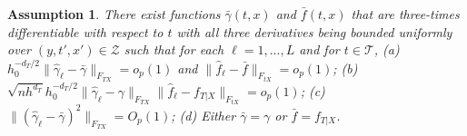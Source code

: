 \documentclass[lettersize, 12pt]{article}
\newtheorem{assumption}{Assumption}
\begin{document}
\begin{assumption}
There exist functions $\bar \gamma(t,x)$ and $\bar f(t,x)$ that 
are three-times differentiable with respect to $t$ with all
three derivatives being bounded uniformly over $(y,t',x') \in\mathcal{Z}$ such that 
for each $\ell = 1,..., L$ and for $t\in\mathcal{T}$,
(a) $h_0^{-d_T/2}\|\hat\gamma_\ell-\bar \gamma\|_{F_{TX}} = o_p(1)$
and $\|\hat f_\ell - \bar f\|_{F_{tX}}= o_p(1)$;
(b) $\sqrt{nh^{d_T}} h_0^{-d_T/2}\|\hat\gamma_\ell- \gamma\|_{F_{TX}}\|\hat f_\ell -  f_{T|X}\|_{F_{tX}} = o_p(1)$;
(c)
$\|(\hat\gamma_\ell - \bar \gamma)^2\|_{F_{TX}} = O_p(1)$;
(d) Either $\bar \gamma = \gamma$ or $\bar{f} = f_{T|X}$.
%
%
\label{A1stU}
\end{assumption}

%
%
%


\end{document}
